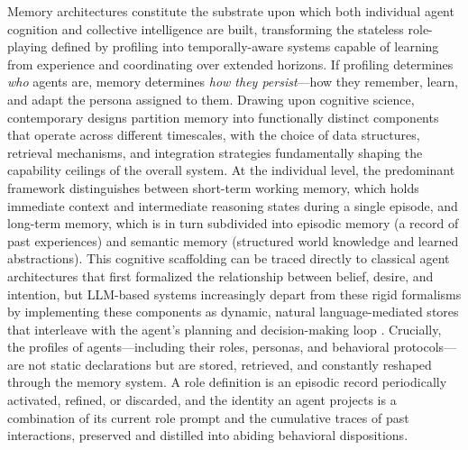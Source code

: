 \documentclass[11pt,a4paper]{article}
\begin{document}
Memory architectures constitute the substrate upon which both individual agent cognition and collective intelligence are built, transforming the stateless role-playing defined by profiling into temporally-aware systems capable of learning from experience and coordinating over extended horizons. If profiling determines \emph{who} agents are, memory determines \emph{how they persist}---how they remember, learn, and adapt the persona assigned to them. Drawing upon cognitive science, contemporary designs partition memory into functionally distinct components that operate across different timescales, with the choice of data structures, retrieval mechanisms, and integration strategies fundamentally shaping the capability ceilings of the overall system. At the individual level, the predominant framework distinguishes between short-term working memory, which holds immediate context and intermediate reasoning states during a single episode, and long-term memory, which is in turn subdivided into episodic memory (a record of past experiences) and semantic memory (structured world knowledge and learned abstractions). This cognitive scaffolding can be traced directly to classical agent architectures that first formalized the relationship between belief, desire, and intention, but LLM-based systems increasingly depart from these rigid formalisms by implementing these components as dynamic, natural language-mediated stores that interleave with the agent's planning and decision-making loop \cite{arxiv:2404.13501v1}. Crucially, the profiles of agents---including their roles, personas, and behavioral protocols---are not static declarations but are stored, retrieved, and constantly reshaped through the memory system. A role definition is an episodic record periodically activated, refined, or discarded, and the identity an agent projects is a combination of its current role prompt and the cumulative traces of past interactions, preserved and distilled into abiding behavioral dispositions.
\end{document}
